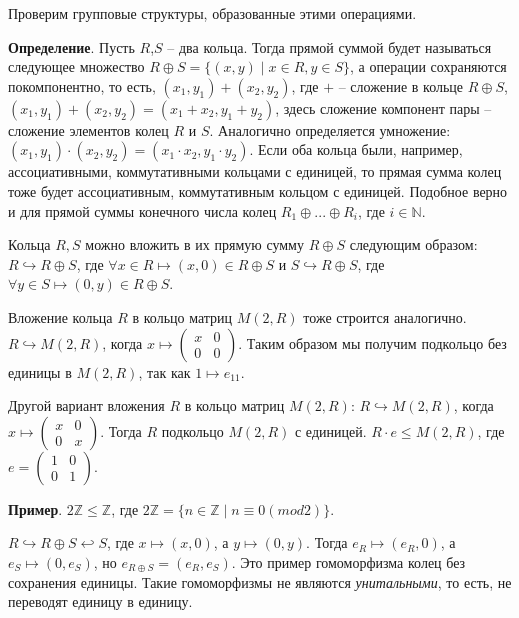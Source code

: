 \documentclass[a4paper]{book}
\begin{document}
Проверим групповые структуры, образованные этими операциями. 


\textbf{Определение}. Пусть $R$,$S$ -- два кольца. Тогда прямой суммой будет называться следующее множество $R\oplus S = \{(x,y)\mid x\in R, y\in S\}$, а операции сохраняются покомпонентно, то есть, $(x_1,y_1)+(x_2,y_2)$, где $+$ -- сложение в кольце $R\oplus S$, $(x_1,y_1)+(x_2,y_2) = (x_1 + x_2, y_1 + y_2)$, здесь сложение компонент пары -- сложение элементов колец $R$ и $S$. Аналогично определяется умножение: $(x_1,y_1)\cdot(x_2,y_2) = (x_1 \cdot x_2, y_1 \cdot y_2)$. Если оба кольца были, например, ассоциативными, коммутативными кольцами с единицей, то прямая сумма колец тоже будет ассоциативным, коммутативным кольцом с единицей. Подобное верно и для прямой суммы конечного числа колец $R_1\oplus...\oplus R_i$, где $i\in\mathbb{N}$.

Кольца $R,S$ можно вложить в их прямую сумму $R\oplus S$ следующим образом: $R\hookrightarrow R\oplus S$, где $\forall x\in R \mapsto (x,0)\in R\oplus S$ и $S\hookrightarrow R\oplus S$, где $\forall y\in S \mapsto (0,y) \in R\oplus S$. 

Вложение кольца $R$ в кольцо матриц $M(2,R)$ тоже строится аналогично. $R \hookrightarrow M(2,R)$, когда $x \mapsto 
\begin{pmatrix}
x & 0\\
0 & 0
\end{pmatrix}
$. Таким образом мы получим подкольцо без единицы в $M(2,R)$, так как $1 \mapsto e_{11}$. 

Другой вариант вложения $R$ в кольцо матриц $M(2,R)$: $R\hookrightarrow M(2,R)$, когда $x \mapsto 
\begin{pmatrix}
x & 0\\
0 & x
\end{pmatrix}
$. Тогда $R$ подкольцо $M(2,R)$ с единицей. $R \cdot e \leqslant M(2,R)$, где $e = 
\begin{pmatrix}
1 & 0\\
0 & 1
\end{pmatrix}$. 


\textbf{Пример}. $2\mathbb{Z} \leqslant \mathbb{Z}$, где $2\mathbb{Z} = \{n\in\mathbb{Z}\mid n\equiv 0 (mod 2)\}$. 


$R \hookrightarrow R\oplus S \hookleftarrow S$, где $x \mapsto (x,0)$, а $y \mapsto (0,y)$. Тогда $e_R \mapsto (e_R,0)$, а $e_S \mapsto (0,e_S)$, но $e_{R\oplus S} = (e_R,e_S)$. Это пример гомоморфизма колец без сохранения единицы.  Такие гомоморфизмы не являются \textit{унитальными}, то есть, не переводят единицу в единицу. 
\end{document}
